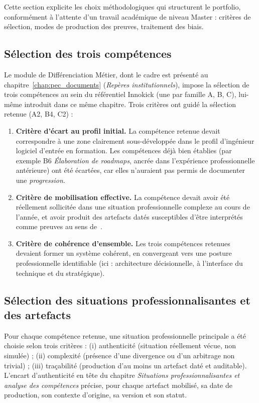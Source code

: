 Cette section explicite les choix méthodologiques qui structurent le portfolio, conformément à l'attente d'un travail académique de niveau Master : critères de sélection, modes de production des preuves, traitement des biais.

\subsection*{Sélection des trois compétences}

Le module de Différenciation Métier, dont le cadre est présenté au chapitre~\ref{chap:pec_documents} (\emph{Repères institutionnels}), impose la sélection de trois compétences au sein du référentiel Innokick (une par famille A, B, C), lui-même introduit dans ce même chapitre. Trois critères ont guidé la sélection retenue (A2, B4, C2) :

\begin{enumerate}
    \item \textbf{Critère d'écart au profil initial.} La compétence retenue devait correspondre à une zone clairement sous-développée dans le profil d'ingénieur logiciel d'entrée en formation. Les compétences déjà bien établies (par exemple B6 \emph{Élaboration de roadmaps}, ancrée dans l'expérience professionnelle antérieure) ont été écartées, car elles n'auraient pas permis de documenter une \emph{progression}.
    \item \textbf{Critère de mobilisation effective.} La compétence devait avoir été réellement sollicitée dans une situation professionnelle complexe au cours de l'année, et avoir produit des artefacts datés susceptibles d'être interprétés comme preuves au sens de~\citet{tardif2006}.
    \item \textbf{Critère de cohérence d'ensemble.} Les trois compétences retenues devaient former un système cohérent, en convergeant vers une posture professionnelle identifiable (ici : architecture décisionnelle, à l'interface du technique et du stratégique).
\end{enumerate}

\subsection*{Sélection des situations professionnalisantes et des artefacts}

Pour chaque compétence retenue, une situation professionnelle principale a été choisie selon trois critères : (i) authenticité (situation réellement vécue, non simulée) ; (ii) complexité (présence d'une divergence ou d'un arbitrage non trivial) ; (iii) traçabilité (production d'au moins un artefact daté et auditable). L'encart d'authenticité en tête du chapitre \emph{Situations professionnalisantes et analyse des compétences} précise, pour chaque artefact mobilisé, sa date de production, son contexte d'origine, sa version et son statut.

